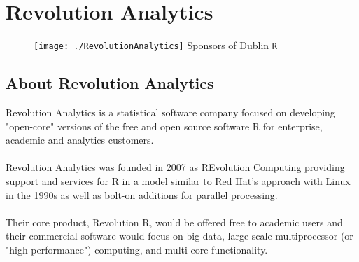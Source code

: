 \documentclass[a4paper,12pt]{article}
\begin{document}
\tableofcontents
\newpage
\section*{Revolution Analytics}
\begin{figure}[h!]
\centering
\texttt{[image: ./RevolutionAnalytics]}
\hspace{8\baselineskip} {\Large Sponsors of Dublin \texttt{R}}
\end{figure}




\subsection*{About Revolution Analytics}
Revolution Analytics is a statistical software company focused on developing "open-core" versions of the free and open source software R for enterprise, academic and analytics customers. 
\\
\\
\noindent Revolution Analytics was founded in 2007 as REvolution Computing providing support and services for R in a model similar to Red Hat's approach with Linux in the 1990s as well as bolt-on additions for parallel processing. 
\\
\\
\noindent Their core product, Revolution R, would be offered free to academic users and their commercial software would focus on big data, large scale multiprocessor (or "high performance") computing, and multi-core functionality.
\newpage
\end{document}
